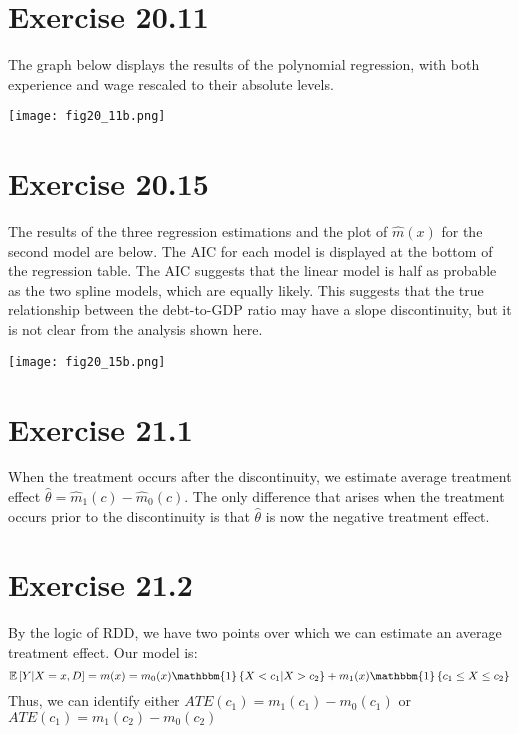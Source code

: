 \documentclass{article}
\newcommand{\one}[1]{\mathbbm{1}\left\{#1\right\}}
\newcommand{\E}[1]{\mathbb{E}\left[#1\right]}%
\begin{document}
\section*{Exercise 20.11}
The graph below displays the results of the polynomial regression, with both experience and wage rescaled to their absolute levels.
\begin{center}
	\texttt{[image: fig20\_11b.png]}
\end{center}


\section*{Exercise 20.15}

The results of the three regression estimations and the plot of $\hat{m}(x)$ for the second model are below. The AIC for each model is displayed at the bottom of the regression table. The AIC suggests that the linear model is half as probable as the two spline models, which are equally likely. This suggests that the true relationship between the debt-to-GDP ratio may have a slope discontinuity, but it is not clear from the analysis shown here.

\begin{center}
	
\end{center}

\begin{center}
	\texttt{[image: fig20\_15b.png]}
\end{center}


\section*{Exercise 21.1}
When the treatment occurs after the discontinuity, we estimate average treatment effect ${\hat{\theta} = \hat{m}_1(c)-\hat{m}_0(c)}$. The only difference that arises when the treatment occurs prior to the discontinuity is that $\hat{\theta}$ is now the negative treatment effect.


\section*{Exercise 21.2}
By the logic of RDD, we have two points over which we can estimate an average treatment effect. Our model is:
\[
	\E{Y|X=x,D} = m(x) = m_0(x)\one{X<c_1|X>c_2} + m_1(x)\one{c_1\leq X\leq c_2}
\]
Thus, we can identify either ${ATE(c_1) = m_1(c_1)-m_0(c_1)}$ or ${ATE(c_1) = m_1(c_2)-m_0(c_2)}$
\end{document}
